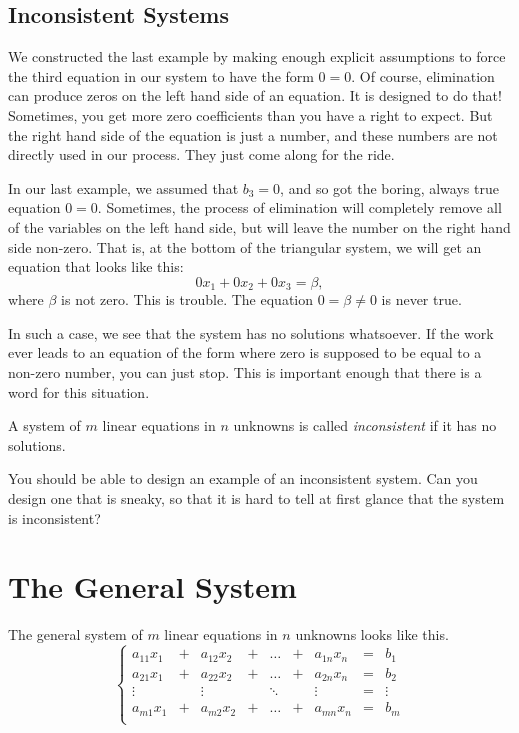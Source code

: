 \documentclass[00-livre-main.tex]{subfiles}
\begin{document}
\subsection*{Inconsistent Systems}

We constructed the last example by making enough explicit assumptions to force the third equation in our system to have the form $0=0$. Of course, elimination can produce zeros on the left hand side of an equation. It is designed to do that! Sometimes, you get more zero coefficients than you have a right to expect. But the right hand side of the equation is just a number, and these numbers are not directly used in our process. They just come along for the ride. 

In our last example, we assumed that $b_3 = 0$, and so got the boring, always true equation $0=0$. 
Sometimes, the process of elimination will completely remove all of the variables on the left hand side, but will leave the number on the right hand side non-zero. That is, at the bottom of the triangular system, we will get an equation that looks like this:
\[
0x_1 + 0x_2 + 0x_3 = \beta,
\]
where $\beta$ is not zero. This is trouble. The equation $0=\beta \neq 0$ is never true. 

In such a case, we see that the system has no solutions whatsoever. If the work ever leads to an equation of the form where zero is supposed to be equal to a non-zero number, you can just stop. This is important enough that there is a word for this situation.

\begin{definition}
A system of $m$ linear equations in $n$ unknowns is called \emph{inconsistent} if it has no solutions.
\end{definition}

You should be able to design an example of an inconsistent system. Can you design one that is sneaky, so that it is hard to tell at first glance that the system is inconsistent?
 

\section*{The General System}

The general system of $m$ linear equations in $n$ unknowns looks like this.
\[
\left\{\begin{array}{rrrrrrrrr}
a_{11}x_1 & + & a_{12} x_2 & + & \dots & + & a_{1n}x_n & = & b_1 \\
a_{21}x_1 & + & a_{22} x_2 & + & \dots & + & a_{2n}x_n & = & b_2 \\
\vdots &  & \vdots &  & \ddots & & \vdots & = & \vdots \\
a_{m1}x_1 & + & a_{m2} x_2 & + & \dots & + & a_{mn}x_n & = & b_m \\
\end{array}\right. 
\]
\end{document}
